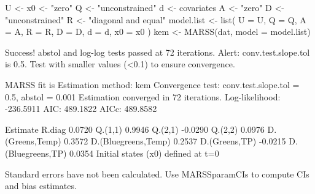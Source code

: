 \begin{Schunk}
\begin{Sinput}
 U <- x0 <- "zero"
 Q <- "unconstrained"
 d <- covariates
 A <- "zero"
 D <- "unconstrained"
 R <- "diagonal and equal"
 model.list <- list(
   U = U, Q = Q, A = A, R = R,
   D = D, d = d, x0 = x0
 )
 kem <- MARSS(dat, model = model.list)
\end{Sinput}
\begin{Soutput}
Success! abstol and log-log tests passed at 72 iterations.
Alert: conv.test.slope.tol is 0.5.
Test with smaller values (<0.1) to ensure convergence.

MARSS fit is
Estimation method: kem 
Convergence test: conv.test.slope.tol = 0.5, abstol = 0.001
Estimation converged in 72 iterations. 
Log-likelihood: -236.5911 
AIC: 489.1822   AICc: 489.8582   
 
                    Estimate
R.diag                0.0720
Q.(1,1)               0.9946
Q.(2,1)              -0.0290
Q.(2,2)               0.0976
D.(Greens,Temp)       0.3572
D.(Bluegreens,Temp)   0.2537
D.(Greens,TP)        -0.0215
D.(Bluegreens,TP)     0.0354
Initial states (x0) defined at t=0

Standard errors have not been calculated. 
Use MARSSparamCIs to compute CIs and bias estimates.
\end{Soutput}
\end{Schunk}
